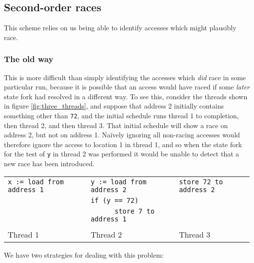 \documentclass[10pt,a4paper,twocolumn]{article}
\begin{document}
\subsection{Second-order races}

This scheme relies on us being able to identify accesses which might
plausibly race.

\subsubsection{The old way}
This is more difficult than simply identifying the accesses which
\emph{did} race in some particular run, because it is possible that an
access would have raced if some \emph{later} state fork had resolved
in a different way.  To see this, consider the threads shown in figure
\ref{fig:three_threads}, and suppose that address 2 initially contains
something other than \verb|72|, and the initial schedule runs thread 1
to completion, then thread 2, and then thread 3.  That initial
schedule will show a race on address 2, but not on address 1.
Na\"ively ignoring all non-racing accesses would therefore ignore the
access to location 1 in thread 1, and so when the state fork for the
test of \verb|y| in thread 2 was performed it would be unable to
detect that a new race has been introduced.

\begin{figure*}
\begin{tabular}{lll}
\verb|x := load from address 1| &
\verb|y := load from address 2| &
\verb|store 72 to address 2| \\
&
\verb|if (y == 72)| &
\\
&
\verb|      store 7 to address 1| &
\\
\hline\\
Thread 1 & Thread 2 & Thread 3
\end{tabular}
\caption{Three threads which race}
\label{fig:three_threads}
\end{figure*}

We have two strategies for dealing with this problem:
\end{document}

